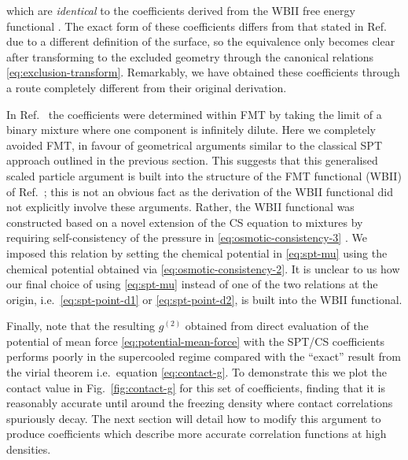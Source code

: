 \documentclass[11pt,twoside]{report}
\begin{document}
which are \emph{identical} to the coefficients derived from the WBII free energy functional%
.
The exact form of these coefficients differs from that stated in Ref.\ \cite{Hansen-GoosJPCM2006} due to a different definition of the surface, so the equivalence only becomes clear after transforming to the excluded geometry through the canonical relations \eqref{eq:exclusion-transform}.
Remarkably, we have obtained these coefficients through a route completely different from their original derivation.

In Ref.\ \cite{Hansen-GoosJPCM2006} the coefficients were determined within FMT by taking the limit of a binary mixture where one component is infinitely dilute.
Here we completely avoided FMT, in favour of geometrical arguments similar to the classical SPT approach outlined in the previous section.
This suggests that this generalised scaled particle argument is built into the structure of the FMT functional (WBII) of Ref.\ \cite{Hansen-GoosJPCM2006}; this is not an obvious fact as the derivation of the WBII functional did not explicitly involve these arguments.
Rather, the WBII functional was constructed based on a novel extension of the CS equation to mixtures by requiring self-consistency of the pressure in \eqref{eq:osmotic-consistency-3} \cite{Hansen-GoosJCP2006}.
We imposed this relation by setting the chemical potential in \eqref{eq:spt-mu} using the chemical potential obtained via \eqref{eq:osmotic-consistency-2}.
It is unclear to us how our final choice of using \eqref{eq:spt-mu} instead of one of the two relations at the origin, i.e.\ \eqref{eq:spt-point-d1} or \eqref{eq:spt-point-d2}, is built into the WBII functional.

Finally, note that the resulting $g^{(2)}$ obtained from direct evaluation of the potential of mean force \eqref{eq:potential-mean-force} with the SPT/CS coefficients performs poorly in the supercooled regime compared with the ``exact'' result from the virial theorem i.e.\ equation \eqref{eq:contact-g}.
To demonstrate this we plot the contact value in Fig.\ \ref{fig:contact-g} for this set of coefficients, finding that it is reasonably accurate until around the freezing density where contact correlations spuriously decay.
The next section will detail how to modify this argument to produce coefficients which describe more accurate correlation functions at high densities.
\end{document}
